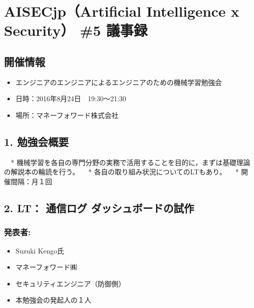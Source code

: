 \documentclass[letterpaper,10pt,dvipdfmx]{sphinxmanual}
\begin{document}
\chapter{AISECjp（Artificial Intelligence x Security） \#5 議事録}
\label{minute-05-20160824::doc}\label{minute-05-20160824:aisecjp-artificial-intelligence-x-security-5}

\section{開催情報}
\label{minute-05-20160824:id1}\begin{itemize}
\item {} 
エンジニアのエンジニアによるエンジニアのための機械学習勉強会

\item {} 
日時：2016年8月24日　19:30～21:30

\item {} 
場所：マネーフォワード株式会社

\end{itemize}


\section{1. 勉強会概要}
\label{minute-05-20160824:id2}
　* 機械学習を各自の専門分野の実務で活用することを目的に，まずは基礎理論の解説本の輪読を行う。
　* 各自の取り組み状況についてのLTもあり。
　* 開催間隔：月１回


\section{2. LT： 通信ログ ダッシュボードの試作}
\label{minute-05-20160824:lt}

\subsection{発表者:}
\label{minute-05-20160824:id3}\begin{itemize}
\item {} 
Suzuki Kengo氏

\item {} 
マネーフォワード㈱

\item {} 
セキュリティエンジニア（防御側）

\item {} 
本勉強会の発起人の１人

\end{itemize}
\end{document}
